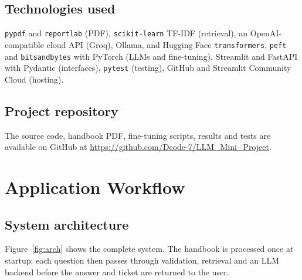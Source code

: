 \documentclass[11pt,a4paper]{report}
\newcommand{\repourl}{\url{https://github.com/Dcode-7/LLM_Mini_Project}}
\begin{document}
\section{Technologies used}
\texttt{pypdf} and \texttt{reportlab} (PDF), \texttt{scikit-learn} TF-IDF (retrieval), an
OpenAI-compatible cloud API (Groq), Ollama, and Hugging Face \texttt{transformers}, \texttt{peft} and
\texttt{bitsandbytes} with PyTorch (LLMs and fine-tuning), Streamlit and FastAPI with Pydantic
(interfaces), \texttt{pytest} (testing), GitHub and Streamlit Community Cloud (hosting).

\section{Project repository}
The source code, handbook PDF, fine-tuning scripts, results and tests are available on GitHub at
\repourl.


\chapter{Application Workflow}

\section{System architecture}
Figure~\ref{fig:arch} shows the complete system. The handbook is processed once at startup; each
question then passes through validation, retrieval and an LLM backend before the answer and ticket
are returned to the user.
\end{document}
